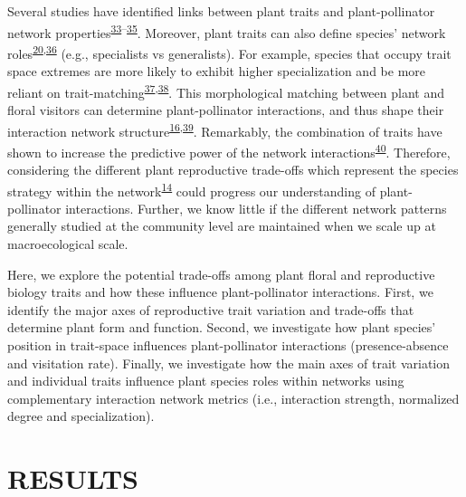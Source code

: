 \documentclass[12pt,a4paper,]{article}
\begin{document}
Several studies have identified links between plant traits and
plant-pollinator network
properties\textsuperscript{\protect\hyperlink{ref-bartomeus2013}{33}--\protect\hyperlink{ref-rowe2020}{35}}.
Moreover, plant traits can also define species' network
roles\textsuperscript{\protect\hyperlink{ref-tur2013}{20},\protect\hyperlink{ref-lazaro2013}{36}}
(e.g., specialists vs generalists). For example, species that occupy
trait space extremes are more likely to exhibit higher specialization
and be more reliant on
trait-matching\textsuperscript{\protect\hyperlink{ref-junker2013}{37},\protect\hyperlink{ref-coux2016}{38}}.
This morphological matching between plant and floral visitors can
determine plant-pollinator interactions, and thus shape their
interaction network
structure\textsuperscript{\protect\hyperlink{ref-stang2009}{16},\protect\hyperlink{ref-ibanez2012}{39}}.
Remarkably, the combination of traits have shown to increase the
predictive power of the network
interactions\textsuperscript{\protect\hyperlink{ref-eklof2013}{40}}.
Therefore, considering the different plant reproductive trade-offs which
represent the species strategy within the
network\textsuperscript{\protect\hyperlink{ref-dehling2016}{14}} could
progress our understanding of plant-pollinator interactions. Further, we
know little if the different network patterns generally studied at the
community level are maintained when we scale up at macroecological
scale.

Here, we explore the potential trade-offs among plant floral and
reproductive biology traits and how these influence plant-pollinator
interactions. First, we identify the major axes of reproductive trait
variation and trade-offs that determine plant form and function. Second,
we investigate how plant species' position in trait-space influences
plant-pollinator interactions (presence-absence and visitation rate).
Finally, we investigate how the main axes of trait variation and
individual traits influence plant species roles within networks using
complementary interaction network metrics (i.e., interaction strength,
normalized degree and specialization).

\section{RESULTS}\label{results}
\end{document}
